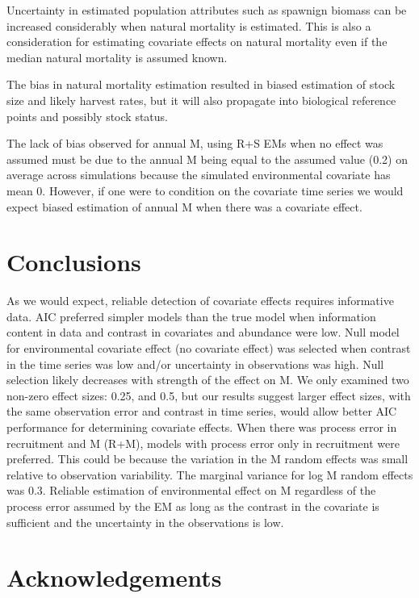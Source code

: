 \documentclass[
  12pt,
]{article}
\begin{document}
Uncertainty in estimated population attributes such as spawnign biomass can be increased considerably when natural mortality is estimated. This is also a consideration for estimating covariate effects on natural mortality even if the median natural mortality is assumed known.

The bias in natural mortality estimation resulted in biased estimation of stock size and likely harvest rates, but it will also propagate into biological reference points and possibly stock status.

The lack of bias observed for annual M, using R+S EMs when no effect was assumed must be due to the annual M being equal to the assumed value (0.2) on average across simulations because the simulated environmental covariate has mean 0. However, if one were to condition on the covariate time series we would expect biased estimation of annual M when there was a covariate effect.

\hypertarget{conclusions}{%
\section*{Conclusions}\label{conclusions}}

As we would expect, reliable detection of covariate effects requires informative data.
AIC preferred simpler models than the true model when information content in data and contrast in covariates and abundance were low. Null model for environmental covariate effect (no covariate effect) was selected when contrast in the time series was low and/or uncertainty in observations was high. Null selection likely decreases with strength of the effect on M. We only examined two non-zero effect sizes: 0.25, and 0.5, but our results suggest larger effect sizes, with the same observation error and contrast in time series, would allow better AIC performance for determining covariate effects. When there was process error in recruitment and M (R+M), models with process error only in recruitment were preferred. This could be because the variation in the M random effects was small relative to observation variability. The marginal variance for log M random effects was 0.3. Reliable estimation of environmental effect on M regardless of the process error assumed by the EM as long as the contrast in the covariate is sufficient and the uncertainty in the observations is low.

\hypertarget{acknowledgements}{%
\section*{Acknowledgements}\label{acknowledgements}}
\end{document}

